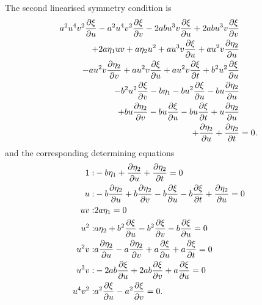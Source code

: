The second linearised symmetry condition is
\begin{align}
  a^{2} u^{4} v^{2} \pdv{\xi}{u} - a^{2} u^{4} v^{2} \pdv{\xi}{v} - 2 a b u^{3} v \pdv{\xi}{u} + 2 a b u^{3} v \pdv{\xi}{v}&\nonumber\\
  + 2 a \eta_1 u v + a \eta_2 u^{2} + a u^{3} v \pdv{\xi}{u} + a u^{2} v \pdv{\eta_2}{u}&\nonumber\\
  - a u^{2} v \pdv{\eta_2}{v} + a u^{2} v \pdv{\xi}{u} + a u^{2} v \pdv{\xi}{t} + b^{2} u^{2} \pdv{\xi}{u}&\nonumber\\
  - b^{2} u^{2} \pdv{\xi}{v} - b \eta_1 - b u^{2} \pdv{\xi}{u} - b u \pdv{\eta_2}{u}&\nonumber\\
  + b u \pdv{\eta_2}{v} - b u \pdv{\xi}{u} - b u \pdv{\xi}{t} + u \pdv{\eta_2}{u}&\nonumber\\
  + \pdv{\eta_2}{u} + \pdv{\eta_2}{t}&=0.\label{eq:Brusselator_lin_sym_2}
\end{align}
and the corresponding determining equations
\begin{align*}
1:&- b \eta_1 + \pdv{\eta_2}{u} + \pdv{\eta_2}{t}=0\\
u:&- b \pdv{\eta_2}{u} + b \pdv{\eta_2}{v} - b \pdv{\xi}{u} - b \pdv{\xi}{t} + \pdv{\eta_2}{u}=0\\
u v:&2 a \eta_1=0\\
u^{2}:&a \eta_2 + b^{2} \pdv{\xi}{u} - b^{2} \pdv{\xi}{v} - b \pdv{\xi}{u}=0\\
u^{2} v:&a \pdv{\eta_2}{u} - a \pdv{\eta_2}{v} + a \pdv{\xi}{u} + a \pdv{\xi}{t}=0\\
u^{3} v:&- 2 a b \pdv{\xi}{u} + 2 a b \pdv{\xi}{v} + a \pdv{\xi}{u}=0\\
u^{4} v^{2}:&a^{2} \pdv{\xi}{u} - a^{2} \pdv{\xi}{v}=0.\\
\end{align*}
